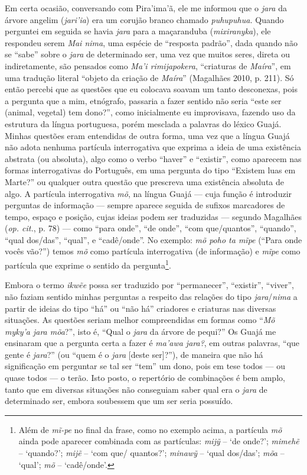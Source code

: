 Em certa ocasião, conversando com Pira'ima'ã, ele me informou que o
\emph{jara} da árvore angelim (\emph{jari'ia}) era um corujão branco
chamado \emph{puhupuhua.} Quando perguntei em seguida se havia
\emph{jara} para a maçaranduba (\emph{mixiranyka}), ele respondeu serem
\emph{Mai nima}, uma espécie de ``resposta padrão'', dada quando não se
``sabe'' sobre o \emph{jara} de determinado ser, uma vez que muitos
seres, direta ou indiretamente, são pensados como \emph{Ma'i
rimijapokera}, ``criaturas de \emph{Maíra}'', em uma tradução literal
``objeto da criação de \emph{Maíra}'' (Magalhães 2010, p. 211). Só então
percebi que as questões que eu colocava soavam um tanto desconexas, pois
a pergunta que a mim, etnógrafo, passaria a fazer sentido não seria
``este ser (animal, vegetal) tem dono?'', como inicialmente eu
improvisava, fazendo uso da estrutura da língua portuguesa, porém
mesclada a palavras do léxico Guajá. Minhas questões eram entendidas de
outra forma, uma vez que a língua Guajá não adota nenhuma partícula
interrogativa que exprima a ideia de uma existência abstrata (ou
absoluta), algo como o verbo ``haver'' e ``existir'', como aparecem nas
formas interrogativas do Português, em uma pergunta do tipo ``Existem
luas em Marte?'' ou qualquer outra questão que prescreva uma existência
absoluta de algo. A partícula interrogativa \emph{mõ}, na língua Guajá ---
cuja função é introduzir perguntas de informação --- sempre aparece
seguida de sufixos marcadores de tempo, espaço e posição, cujas ideias
podem ser traduzidas --- segundo Magalhães (\emph{op. cit.}, p. 78) --- como ``para
onde'', ``de onde'', ``com que/quantos'', ``quando'', ``qual dos/das'', ``qual'', e
``cadê/onde''. No exemplo: \emph{mõ poho ta mĩpe} (``Para onde vocês vão?'')
temos \emph{mõ} como partícula interrogativa (de informação) e
\emph{mĩpe} como partícula que exprime o sentido da pergunta\footnote{Além
  de \emph{mĩ-pe} no final da frase, como no exemplo acima, a partícula
  \emph{mõ} ainda pode aparecer combinada com as partículas: \emph{mijỹ}
  -- `de onde?'; \emph{mimehẽ} -- `quando?'; \emph{mijẽ} -- `com que/
  quantos?'; \emph{minawỹ} -- `qual dos/das'; \emph{mõa} -- `qual';
  \emph{mõ} -- `cadê/onde'.}.

Embora o termo \emph{ikwẽe} possa ser traduzido por ``permanecer'',
``existir'', ``viver'', não faziam sentido minhas perguntas a respeito das
relações do tipo \emph{jara}/\emph{nima} a partir de ideias do tipo ``há''
ou ``não há'' criadores e criaturas nas diversas situações. As questões
seriam melhor compreendidas em formas como ``\emph{Mõ myky'a jara mõa}?'',
isto é, ``Qual o \emph{jara} da árvore de pequi?'' Os Guajá me ensinaram
que a pergunta certa a fazer é \emph{ma'awa jara?}, em outras palavras,
``que gente é \emph{jara}?'' (ou ``quem é o \emph{jara} {[}deste ser{]}?''),
de maneira que não há significação em perguntar se tal ser ``tem'' um
dono, pois em tese todos --- ou quase todos --- o terão. Isto posto, o
repertório de combinações é bem amplo, tanto que em diversas situações
não conseguiam saber qual era o \emph{jara} de determinado ser, embora
soubessem que um ser seria possuído.

